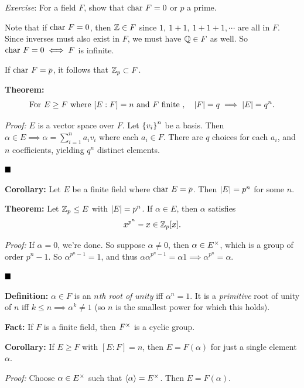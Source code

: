 \emph{Exercise}: For a field \(F\), show that \(\mathrm{char}~ F = 0\) or \(p\) a
prime.

Note that if \(\mathrm{char}~ F = 0\), then \({\mathbb{Z}} \in F\) since
\(1,~ 1+1,~ 1+1+1, \cdots\) are all in \(F\). Since inverses must also
exist in \(F\), we must have \({\mathbb{Q}} \in F\) as well. So
\(\mathrm{char}~ F = 0 \iff F\) is infinite.

If \(\mathrm{char}~ F = p\), it follows that \({\mathbb{Z}}_p \subset F\).

\textbf{Theorem:}
\begin{align*}
\text{For } E \geq F \text{ where } [E: F] = n \text{ and } F \text{ finite }, \quad
{\left\lvert {F} \right\rvert} = q \implies {\left\lvert {E} \right\rvert} = q^n
.\end{align*}

\emph{Proof:} \(E\) is a vector space over \(F\). Let \(\left\{{v_i}\right\}^n\)
be a basis. Then \(\alpha \in E \implies \alpha = \sum_{i=1}^n a_i v_i\)
where each \(a_i \in F\). There are \(q\) choices for each \(a_i\), and
\(n\) coefficients, yielding \(q^n\) distinct elements.

\(\qed\)

\textbf{Corollary:} Let \(E\) be a finite field where \(\mathrm{char}~ E = p\).
Then \({\left\lvert {E} \right\rvert} = p^n\) for some \(n\).

\textbf{Theorem:} Let \({\mathbb{Z}}_p \leq E\) with \({\left\lvert {E} \right\rvert} = p^n\). If
\(\alpha \in E\), then \(\alpha\) satisfies
\begin{align*}
x^{p^n} - x \in {\mathbb{Z}}_p[x].
\end{align*}

\emph{Proof:} If \(\alpha = 0\), we're done. So suppose
\(\alpha \neq 0\), then \(\alpha \in E^{\times}\), which is a group of
order \(p^n - 1\). So \(\alpha^{p^n - 1} = 1\), and thus
\(\alpha \alpha^{p^n - 1} = \alpha 1 \implies \alpha^{p^n} = \alpha\).

\(\qed\)

\textbf{Definition:} \(\alpha \in F\) is an \emph{\(n\)th root of unity}
iff \(\alpha^n = 1\). It is a \emph{primitive} root of unity of \(n\)
iff \(k\leq n \implies \alpha^k \neq 1\) (so \(n\) is the smallest power
for which this holds).

\textbf{Fact:} If \(F\) is a finite field, then \(F^{\times}\) is a cyclic
group.

\textbf{Corollary:} If \(E \geq F\) with \([E: F] = n\), then
\(E = F(\alpha)\) for just a single element \(\alpha\).

\emph{Proof:} Choose \(\alpha \in E^{\times}\) such that
\(\left\langle{\alpha}\right\rangle = E^{\times}\). Then \(E = F(\alpha)\).

